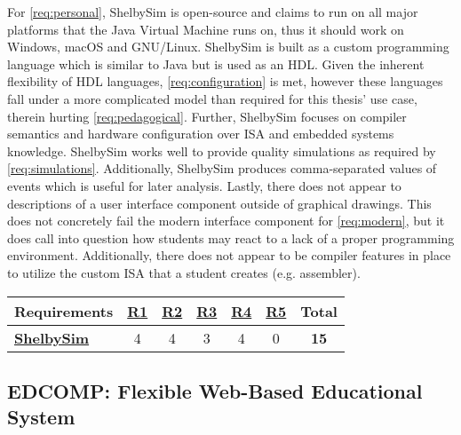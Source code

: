 For \cref{req:personal}, ShelbySim is open-source and claims to run on all major platforms that the Java Virtual Machine runs on, thus it should work on Windows, macOS and GNU/Linux. ShelbySim is built as a custom programming language which is similar to Java but is used as an HDL. Given the inherent flexibility of HDL languages, \cref{req:configuration} is met, however these languages fall under a more complicated model than required for this thesis' use case, therein hurting \cref{req:pedagogical}. Further, ShelbySim focuses on compiler semantics and hardware configuration over ISA and embedded systems knowledge.  ShelbySim works well to provide quality simulations as required by \cref{req:simulations}. Additionally, ShelbySim produces comma-separated values of events which is useful for later analysis. Lastly, there does not appear to descriptions of a user interface component outside of graphical drawings. This does not concretely fail the modern interface component for \cref{req:modern}, but it does call into question how students may react to a lack of a proper programming environment. Additionally, there does not appear to be compiler features in place to utilize the custom ISA that a student creates (e.g. assembler).

\begin{table}[h!]
    \centering
    \begin{tabular}{l|cccccc}
        \textbf{Requirements} & \textbf{\hyperref[req:personal]{R1}} & \textbf{\hyperref[req:configuration]{R2}} & \textbf{\hyperref[req:pedagogical]{R3}} & \textbf{\hyperref[req:simulations]{R4}} & \textbf{\hyperref[req:modern]{R5}} & \textbf{Total} \\ \hline
        \textbf{\hyperref[sec:review-shelbysim]{ShelbySim} \cite{Tappan2009, Tappan2009-2}} & 4                                  & 4                                    & 3                            & 4                                  & 0                             & \textbf{15}    \\
    \end{tabular}
\end{table}

\subsection{EDCOMP: Flexible Web-Based Educational System}
\label{sec:review-edcomp}

